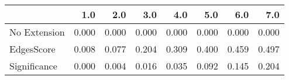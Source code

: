 \begin{tabular}{lrrrrrrr}
\toprule
{} &   1.0 &   2.0 &   3.0 &   4.0 &   5.0 &   6.0 &   7.0 \\
\midrule
No Extension & 0.000 & 0.000 & 0.000 & 0.000 & 0.000 & 0.000 & 0.000 \\
EdgesScore   & 0.008 & 0.077 & 0.204 & 0.309 & 0.400 & 0.459 & 0.497 \\
Significance & 0.000 & 0.004 & 0.016 & 0.035 & 0.092 & 0.145 & 0.204 \\
\bottomrule
\end{tabular}
